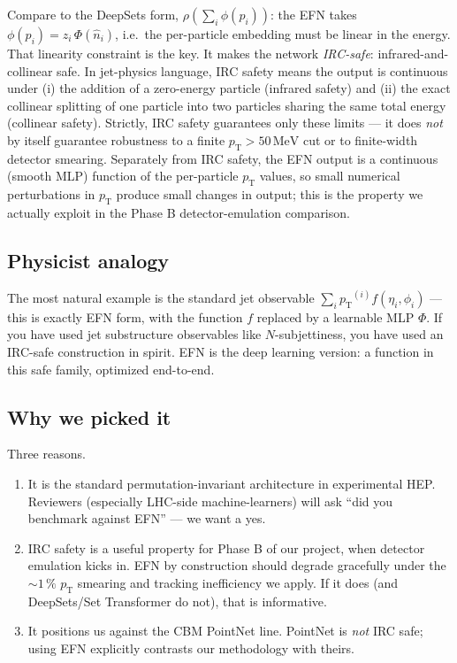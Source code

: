 \documentclass[11pt]{article}
\newcommand{\pT}{\ensuremath{p_{\text{T}}}}
\begin{document}
Compare to the DeepSets form, $\rho(\sum_i \phi(p_i))$: the EFN takes
$\phi(p_i) = z_i \, \Phi(\hat{n}_i)$, i.e.\ the per-particle embedding
must be linear in the energy. That linearity constraint is the
key. It makes the network \emph{IRC-safe}: infrared-and-collinear
safe. In jet-physics language, IRC safety means the output is
continuous under (i) the addition of a zero-energy particle
(infrared safety) and (ii) the exact collinear splitting of one
particle into two particles sharing the same total energy (collinear
safety). Strictly, IRC safety guarantees only these limits --- it
does \emph{not} by itself guarantee robustness to a finite
$\pT > 50\,\text{MeV}$ cut or to finite-width detector smearing.
Separately from IRC safety, the EFN output is a continuous (smooth
MLP) function of the per-particle $\pT$ values, so small numerical
perturbations in $\pT$ produce small changes in output; this is the
property we actually exploit in the Phase B detector-emulation
comparison.

\subsection{Physicist analogy}

The most natural example is the standard jet observable
$\sum_i \pT^{(i)} f(\eta_i, \phi_i)$ --- this is exactly EFN form,
with the function $f$ replaced by a learnable MLP $\Phi$. If you have
used jet substructure observables like $N$-subjettiness, you have used
an IRC-safe construction in spirit. EFN is the deep learning version:
a function in this safe family, optimized end-to-end.

\subsection{Why we picked it}

Three reasons.

\begin{enumerate}[leftmargin=*]
\item It is the standard permutation-invariant architecture in
      experimental HEP. Reviewers (especially LHC-side
      machine-learners) will ask ``did you benchmark against EFN'' ---
      we want a yes.
\item IRC safety is a useful property for Phase B of our project, when
      detector emulation kicks in. EFN by construction should degrade
      gracefully under the $\sim 1\,\%$ $\pT$ smearing and tracking
      inefficiency we apply. If it does (and DeepSets/Set Transformer
      do not), that is informative.
\item It positions us against the CBM PointNet line. PointNet is
      \emph{not} IRC safe; using EFN explicitly contrasts our
      methodology with theirs.
\end{enumerate}
\end{document}
